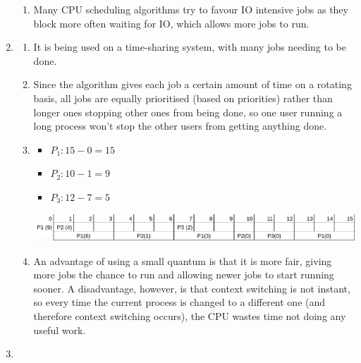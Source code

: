 \documentclass[12pt]{article}
\begin{document}
\begin{enumerate}
\begin{enumerate}
                  \item Many CPU scheduling algorithms try to favour IO intensive jobs as they block more often waiting for IO, which allows more jobs to run.
            \end{enumerate}
      \item \begin{enumerate}
                  \item It is being used on a time-sharing system, with many jobs needing to be done.
                  \item Since the algorithm gives each job a certain amount of time on a rotating basis, all jobs are equally prioritised (based on priorities) rather than longer ones stopping other ones from being done, so one user running a long process won't stop the other users from getting anything done.
                  \item \begin{itemize}
                              \item $P_1: 15 - 0 = 15$
                              \item $P_2: 10 - 1 = 9$
                              \item $P_3: 12 - 7 = 5$
                        \end{itemize}
                        \includegraphics[scale=0.4]{1-roundrobin.png}
                  \item An advantage of using a small quantum is that it is more fair, giving more jobs the chance to run and allowing newer jobs to start running sooner. A disadvantage, however, is that context switching is not instant, so every time the current process is changed to a different one (and therefore context switching occurs), the CPU wastes time not doing any useful work.
            \end{enumerate}
      \item \begin{enumerate}

\end{enumerate}
\end{enumerate}
\end{document}
